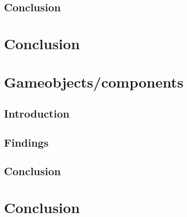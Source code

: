 \documentclass{projdoc}
\begin{document}
\subsection{Conclusion}

\section{Conclusion}

\section{Gameobjects/components}

\subsection{Introduction}

\subsection{Findings}

\subsection{Conclusion}

\section{Conclusion}
\end{document}

